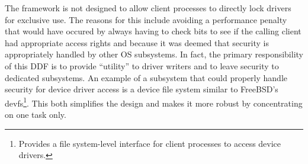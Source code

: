 The framework is not designed to allow client processes to directly lock
drivers for exclusive use.  The reasons for this include avoiding a
performance penalty that would have occured by always having to check bits to
see if the calling client had appropriate access rights and because it was
deemed that security is appropriately handled by other OS subsystems.  In
fact, the primary responsibility of this DDF is to provide ``utility'' to
driver writers and to leave security to dedicated subsystems.  An example of a
subsystem that could properly handle security for device driver access is a
device file system similar to FreeBSD's devfs\footnote{Provides a file
system-level interface for client processes to access device drivers.}.
This both simplifies the design and makes it more robust by concentrating on
one task only.






